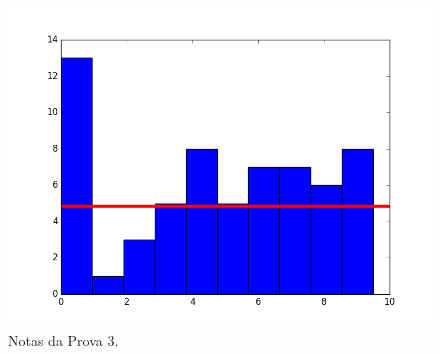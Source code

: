 \documentclass{article}
\begin{document}
\begin{figure}[ht]
\begin{center}
\includegraphics{prova3.png}
\end{center}
\caption{Notas da Prova 3.}
\end{figure}
\end{document}
